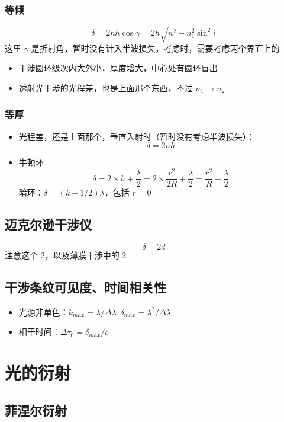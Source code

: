 \documentclass{article}
\begin{document}
\subsubsection{等倾}

$$
\delta=2nh\cos\gamma=2h\sqrt{n^2-n_1^2\sin^2i}
$$
这里 $\gamma$ 是折射角，暂时没有计入半波损失，考虑时，需要考虑两个界面上的~
\begin{itemize}
    \item 干涉圆环级次内大外小，厚度增大，中心处有圆环冒出
    \item 透射光干涉的光程差，也是上面那个东西，不过 $n_1\to n_2$
\end{itemize}

\subsubsection{等厚}

\begin{itemize}
    \item 光程差，还是上面那个，垂直入射时（暂时没有考虑半波损失）：$$
    \delta=2nh
    $$
    \item 牛顿环 $$
    \delta=2\times h+\frac{\lambda}{2}=2\times \frac{r^2}{2R}+\frac{\lambda}{2}=\frac{r^2}{R}+\frac{\lambda}{2}
    $$ 暗环：$\delta=(k+1/2)\lambda$，包括 $r=0$
\end{itemize}

\subsection{迈克尔逊干涉仪}

$$
\delta=2d
$$
注意这个 $2$，以及薄膜干涉中的 $2$

\subsection{干涉条纹可见度、时间相关性}

\begin{itemize}
    \item 光源非单色：$k_{max}=\lambda/\Delta\lambda, \delta_{max}=\lambda^2/\Delta\lambda$
    \item 相干时间：$\Delta\tau_0=\delta_{max}/c$
\end{itemize}

\section{光的衍射}

\subsection{菲涅尔衍射}
\end{document}
